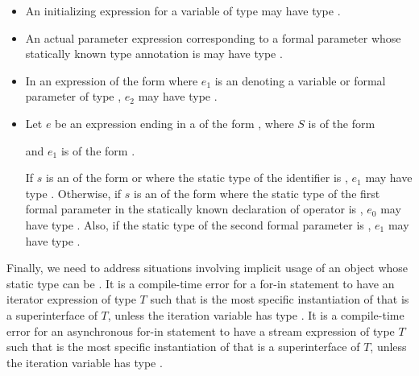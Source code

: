 \documentclass[makeidx]{article}
\begin{document}
{\begin{itemize}
{  (\ref{functions}).%
  }
\item
  An initializing expression for a variable of type \VOID{}
  may have type \VOID.
\item
  An actual parameter expression corresponding to a formal parameter
  whose statically known type annotation is \VOID{}
  may have type \VOID.
\item
  In an expression of the form 
  where $e_1$ is an 
  denoting a variable or formal parameter of type \VOID{},
  $e_2$ may have type \VOID.
\item
  Let $e$ be an expression ending in a 
  of the form ,
  where $S$ is of the form

  \noindent

  \noindent
  and $e_1$ is of the form .

  If $s$ is an  of the
  form  or 
  where the static type of the identifier \id{} is \VOID,
  $e_1$ may have type \VOID.
  Otherwise, if $s$ is an  of the form
  \code{[$\,e_0\,$]} where the static type of
  the first formal parameter in the statically known declaration
  of operator \code{[]=} is \VOID,
  $e_0$ may have type \VOID.
  Also, if the static type of the second formal parameter is \VOID,
  $e_1$ may have type \VOID.
\end{itemize}

\LMHash{}%
Finally, we need to address situations involving implicit usage of
an object whose static type can be \VOID{}.
%
It is a compile-time error for a for-in statement to have an iterator
expression of type $T$ such that 
is the most specific instantiation of 
that is a superinterface of $T$, unless the
iteration variable has type \VOID.
%
It is a compile-time error for an asynchronous for-in statement
to have a stream expression of type $T$
such that  is the most specific
instantiation of  that is a superinterface of $T$,
unless the iteration variable has type \VOID.

}
\end{document}
